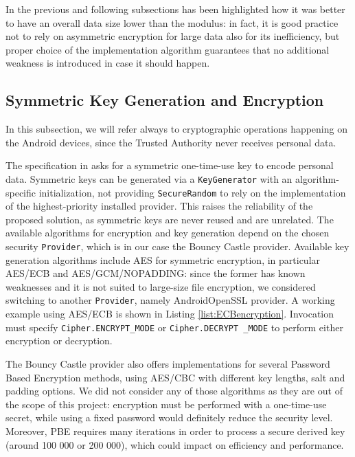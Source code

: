 In the previous and following subsections has been highlighted how it was better to have an overall data size lower than the modulus: in fact, it is good practice not to rely on asymmetric encryption for large data also for its inefficiency, but proper choice of the implementation algorithm guarantees that no additional weakness is introduced in case it should happen.

\subsection{Symmetric Key Generation and Encryption}
In this subsection, we will refer always to cryptographic operations happening on the Android devices, since the Trusted Authority never receives personal data.

The specification in \cite{pearson2011sticky} asks for a symmetric one-time-use key to encode personal data. Symmetric keys can be generated via a \texttt{KeyGenerator} with an algorithm-specific initialization, not providing \texttt{SecureRandom} to rely on the implementation of the highest-priority installed provider. This raises the reliability of the proposed solution, as symmetric keys are never reused and are unrelated. The available algorithms for encryption and key generation depend on the chosen security \texttt{Provider}, which is in our case the Bouncy Castle provider. Available key generation algorithms include AES for symmetric encryption, in particular AES/ECB and AES/GCM/NOPADDING: since the former has known weaknesses and it is not suited to large-size file encryption, we considered switching to another \texttt{Provider}, namely AndroidOpenSSL provider. A working example using AES/ECB is shown in Listing \ref{list:ECBencryption}. Invocation must specify \texttt{Cipher.ENCRYPT\_MODE} or \texttt{Cipher.DECRYPT \_MODE} to perform either encryption or decryption.



The Bouncy Castle provider also offers implementations for several Password Based Encryption methods, using AES/CBC with different key lengths, salt and padding options. We did not consider any of those algorithms as they are out of the scope of this project: encryption must be performed with a one-time-use secret, while using a fixed password would definitely reduce the security level. Moreover, PBE requires many iterations in order to process a secure derived key (around 100 000 or 200 000), which could impact on efficiency and performance.


